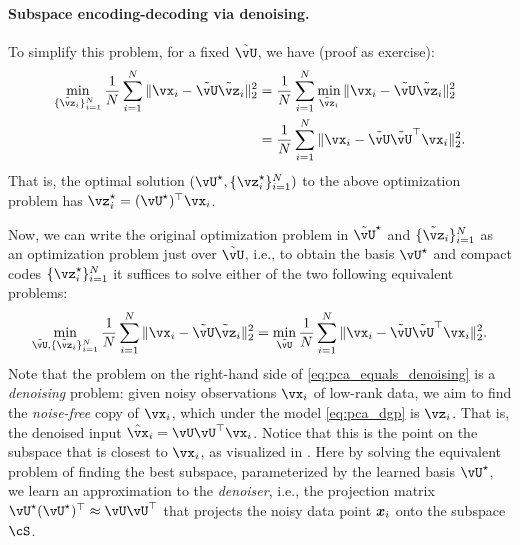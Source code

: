\documentclass[\toplevelprefix/book-main.tex]{subfiles}
\begin{document}
\paragraph{Subspace encoding-decoding via denoising.}
To simplify this problem, for a fixed \(\tilde{\vU}\), we have (proof as exercise):
\begin{align}
    \min_{\{\tilde{\vz}_{i}\}_{i = 1}^{N}}\frac{1}{N}\sum_{i = 1}^{N}\norm{\vx_{i} - \tilde{\vU}\tilde{\vz}_{i}}_{2}^{2} 
    &= \frac{1}{N}\sum_{i = 1}^{N}\min_{\tilde{\vz}_{i}}\norm{\vx_{i} - \tilde{\vU}\tilde{\vz}_{i}}_{2}^{2} \\
    &= \frac{1}{N}\sum_{i = 1}^{N}\norm{\vx_{i} - \tilde{\vU}\tilde{\vU}^{\top}\vx_{i}}_{2}^{2}. 
\end{align}
That is, the optimal solution \((\vU^{\star}, \{\vz_{i}^{\star}\}_{i = 1}^{N})\)
to the above optimization problem has $\vz_i^{\star} = (\vU^{\star})^\top\vx_i$.

Now, we can write the original optimization problem in \(\tilde{\vU}^{\star}\)
and \(\{\tilde{\vz}_{i}\}_{i = 1}^{N}\) as an optimization problem just over
\(\tilde{\vU}\), i.e., to obtain the basis \(\vU^{\star}\) and compact codes
\(\{\vz_{i}^{\star}\}_{i = 1}^{N}\) it suffices to solve either of the two following equivalent problems:
\begin{equation}\label{eq:pca_equals_denoising}
    \min_{\tilde{\vU}, \{\tilde{\vz}_{i}\}_{i = 1}^{N}}\frac{1}{N}\sum_{i = 1}^{N}\norm{\vx_{i} - \tilde{\vU}\tilde{\vz}_{i}}_{2}^{2} = \min_{\tilde{\vU}}\frac{1}{N}\sum_{i = 1}^{N}\norm{\vx_{i} - \tilde{\vU}\tilde{\vU}^{\top}\vx_{i}}_{2}^{2}.
\end{equation}
Note that the problem on the right-hand side of \eqref{eq:pca_equals_denoising}
is a \textit{denoising} problem: given noisy observations \(\vx_{i}\) of
low-rank data, we aim to find the \textit{noise-free} copy of \(\vx_{i}\), which
under the model \eqref{eq:pca_dgp} is $\vz_{i}$. That is, the denoised input
$\hat{\vx}_i = \vU\vU^\top \vx_i$. Notice that this is the point on the subspace
that is closest to $\vx_i$, as visualized in . Here by
solving the equivalent problem of finding the best subspace, parameterized by
the learned basis \(\vU^{\star}\), we learn an approximation to the
\textit{denoiser}, i.e., the projection matrix \(\vU^{\star}(\vU^{\star})^{\top} \approx \vU\vU^{\top}\) that projects the noisy data point $\bm{x}_i$ onto the subspace \(\cS\). %
\end{document}
